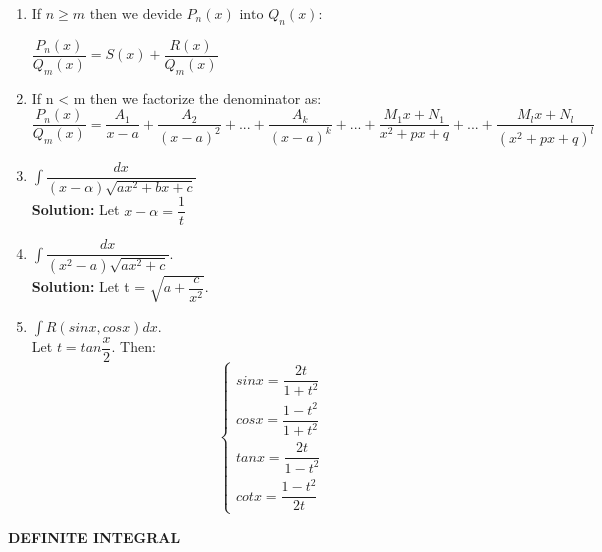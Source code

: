 \documentclass[10pt]{article}
\begin{document}
\begin{enumerate}
    \item If $n \ge m  \mbox{ then we devide } P_n(x) \mbox{ into } Q_n(x):$\\
\begin{center}
$\dfrac{P_n(x)}{Q_m(x)} = S(x) + \dfrac{R(x)}{Q_m(x)}$
\end{center}    
	\item If n < m then we factorize the denominator as:\\

	$\dfrac{P_n(x)}{Q_m(x)} = \dfrac{A_1}{x-a} + \dfrac{A_2}{(x-a)^2} + ... + \dfrac{A_k}{(x-a)^k} + ... + \dfrac{M_1x+N_1}{x^2+px+q} + ... + \dfrac{M_lx+N_l}{(x^2+px+q)^l}$
	\item $\displaystyle \int \dfrac{dx}{(x - \alpha) \sqrt{ax^2+bx+c}}$\\
	\textbf{Solution:} Let $x - \alpha = \dfrac{1}{t}$
	\item $\displaystyle \int \dfrac{dx}{(x^2-a) \sqrt{ax^2+c}}.$\\
	\textbf{Solution:} Let t = $\displaystyle \sqrt{a+ \dfrac{c}{x^2}}.$
	\item $ \displaystyle \int R(sinx,cosx)dx$.\\
	\pagebreak
	Let $t = tan \dfrac{x}{2}$. Then:
      $$     
	\begin{cases}
	sinx = \dfrac{2t}{1+t^2}\\

	cosx = \dfrac{1-t^2}{1+t^2}\\

	tanx = \dfrac{2t}{1-t^2}\\

	cotx = \dfrac{1-t^2}{2t}
	\end{cases}
      $$
  \end{enumerate}
\pagebreak
\begin{center}
\textbf{DEFINITE INTEGRAL}
\end{center}
\end{document}
